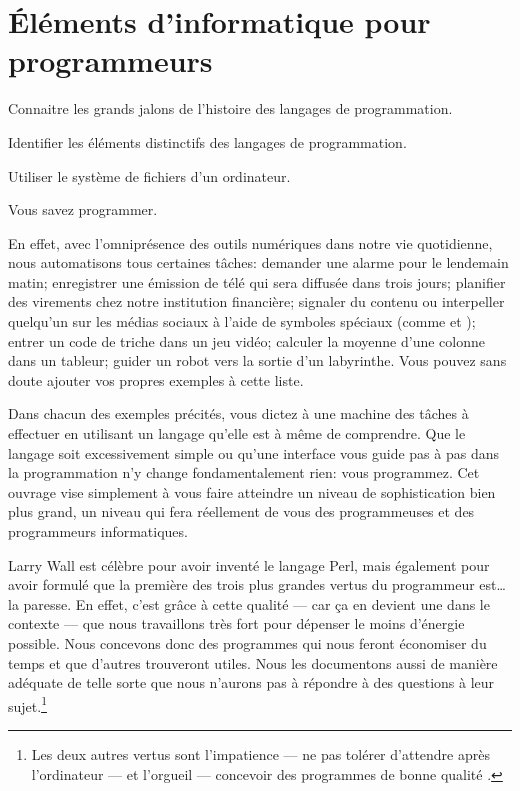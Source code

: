 
\chapter{Éléments d'informatique pour programmeurs}
\label{chap:informatique}

\begin{objectifs}
\item Connaitre les grands jalons de l'histoire des langages
  de programmation.
\item Identifier les éléments distinctifs des langages de
  programmation.
\item Utiliser le système de fichiers d'un ordinateur.
\end{objectifs}

Vous savez programmer.

En effet, avec l'omniprésence des outils numériques dans notre vie
quotidienne, nous automatisons tous certaines tâches:
demander une alarme pour le lendemain matin;
enregistrer une émission de télé qui sera diffusée dans trois jours;
planifier des virements chez notre institution
  financière;
signaler du contenu ou interpeller quelqu'un sur les médias sociaux
  à l'aide de symboles spéciaux (comme \code{\#} et );
entrer un code de triche dans un jeu vidéo;
calculer la moyenne d'une colonne dans un tableur;
guider un robot vers la sortie d'un labyrinthe.
Vous pouvez sans doute ajouter vos propres exemples à cette liste.

Dans chacun des exemples précités, vous dictez à une machine des
tâches à effectuer en utilisant un langage qu'elle est à même de
comprendre. Que le langage soit excessivement simple ou qu'une
interface vous guide pas à pas dans la programmation n'y change
fondamentalement rien: vous programmez. Cet ouvrage vise simplement à
vous faire atteindre un niveau de sophistication bien plus grand, un
niveau qui fera réellement de vous des programmeuses et des
programmeurs informatiques.

Larry Wall est célèbre pour avoir inventé le langage Perl,
mais également pour avoir formulé que la première des trois plus
grandes vertus du programmeur est\dots la paresse. En effet, c'est
grâce à cette qualité --- car ça en devient une dans le contexte ---
que nous travaillons très fort pour dépenser le moins d'énergie
possible. Nous concevons donc des programmes qui nous feront
économiser du temps et que d'autres trouveront utiles. Nous les
documentons aussi de manière adéquate de telle sorte que nous n'aurons
pas à répondre à des questions à leur sujet.\footnote{%
  Les deux autres vertus sont l'impatience --- ne pas tolérer
  d'attendre après l'ordinateur --- et l'orgueil --- concevoir des
  programmes de bonne qualité \citep{Wall:Perl:1996}.}


